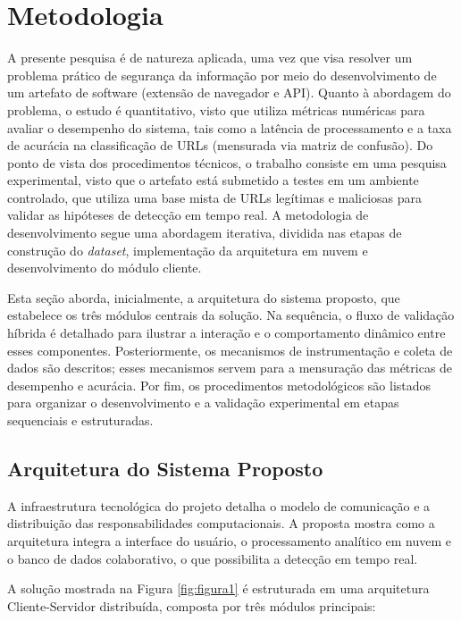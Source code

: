 \documentclass[a4paper,12pt]{article}
\begin{document}
\section{Metodologia}
\label{sec:metodologia}

A presente pesquisa é de natureza aplicada, uma vez que visa resolver um problema prático de segurança da informação por meio do desenvolvimento de um artefato de software (extensão de navegador e API). Quanto à abordagem do problema, o estudo é quantitativo, visto que utiliza métricas numéricas para avaliar o desempenho do sistema, tais como a latência de processamento e a taxa de acurácia na classificação de URLs (mensurada via matriz de confusão). Do ponto de vista dos procedimentos técnicos, o trabalho consiste em uma pesquisa experimental, visto que o artefato está submetido a testes em um ambiente controlado, que utiliza uma base mista de URLs legítimas e maliciosas para validar as hipóteses de detecção em tempo real. A metodologia de desenvolvimento segue uma abordagem iterativa, dividida nas etapas de construção do \textit{dataset}, implementação da arquitetura em nuvem e desenvolvimento do módulo cliente.

Esta seção aborda, inicialmente, a arquitetura do sistema proposto, que estabelece os três módulos centrais da solução. Na sequência, o fluxo de validação híbrida é detalhado para ilustrar a interação e o comportamento dinâmico entre esses componentes. Posteriormente, os mecanismos de instrumentação e coleta de dados são descritos; esses mecanismos servem para a mensuração das métricas de desempenho e acurácia. Por fim, os procedimentos metodológicos são listados para organizar o desenvolvimento e a validação experimental em etapas sequenciais e estruturadas.

\subsection{Arquitetura do Sistema Proposto}

A infraestrutura tecnológica do projeto detalha o modelo de comunicação e a distribuição das responsabilidades computacionais. A proposta mostra como a arquitetura integra a interface do usuário, o processamento analítico em nuvem e o banco de dados colaborativo, o que possibilita a detecção em tempo real.

A solução mostrada na Figura \ref{fig:figura1} é estruturada em uma arquitetura Cliente-Servidor distribuída, composta por três módulos principais:
\end{document}

